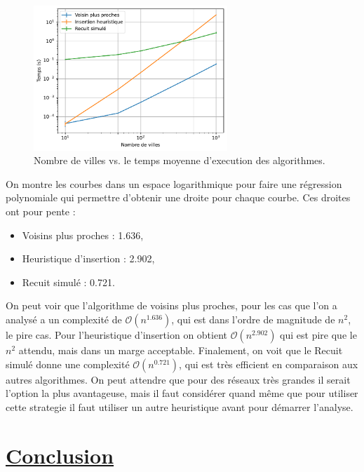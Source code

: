 \documentclass[a4paper,11pt,fleqn]{article}
\begin{document}
\begin{figure}[H]
    \centering
    \includegraphics[width=0.65\textwidth]{images/complexite_temporelle.pdf}
    \caption{Nombre de villes vs. le temps moyenne d'execution des algorithmes.}
    \label{fig:temps}
\end{figure}

On montre les courbes dans un espace logarithmique pour faire une régression polynomiale qui permettre d'obtenir une droite pour chaque courbe. Ces droites ont pour pente :

\begin{itemize}
    \item Voisins plus proches : 1.636,
    \item Heuristique d'insertion : 2.902,
    \item Recuit simulé : 0.721.
\end{itemize}

On peut voir que l'algorithme de voisins plus proches, pour les cas que l'on a analysé a un complexité de $\mathcal{O}(n^{1.636})$, qui est dans l'ordre de magnitude de $n^2$, le pire cas. Pour l'heuristique d'insertion on obtient $\mathcal{O}(n^{2.902})$ qui est pire que le $n^2$ attendu, mais dans un marge acceptable. Finalement, on voit que le Recuit simulé donne une complexité $\mathcal{O}(n^{0.721})$, qui est très efficient en comparaison aux autres algorithmes. On peut attendre que pour des réseaux très grandes il serait l'option la plus avantageuse, mais il faut considérer quand même que pour utiliser cette strategie il faut utiliser un autre heuristique avant pour démarrer l'analyse.

\newpage

\section*{\underline{Conclusion}}

\newpage


\end{document}
